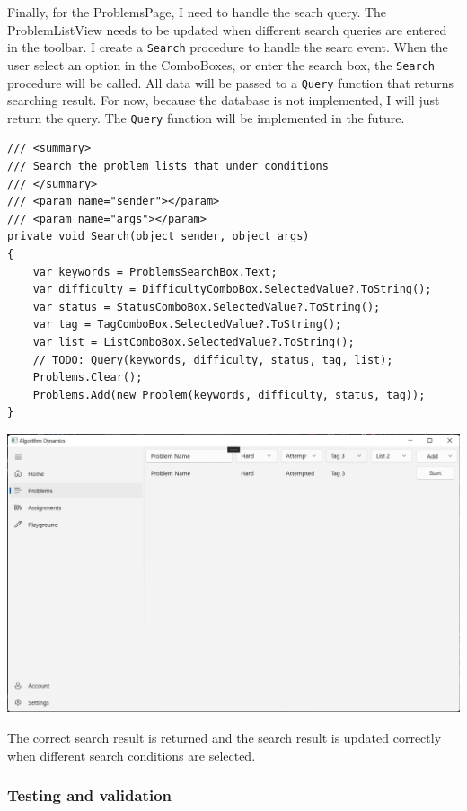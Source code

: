 \documentclass[a4paper]{report}
\begin{document}
Finally, for the ProblemsPage, I need to handle the searh query. The ProblemListView needs to be updated when different search queries are entered in the toolbar. I create a \verb|Search| procedure to handle the searc event. When the user select an option in the ComboBoxes, or enter the search box, the \verb|Search| procedure will be called. All data will be passed to a \verb|Query| function that returns searching result. For now, because the database is not implemented, I will just return the query. The \verb|Query| function will be implemented in the future.

\begin{verbatim}
/// <summary>
/// Search the problem lists that under conditions
/// </summary>
/// <param name="sender"></param>
/// <param name="args"></param>
private void Search(object sender, object args)
{
    var keywords = ProblemsSearchBox.Text;
    var difficulty = DifficultyComboBox.SelectedValue?.ToString();
    var status = StatusComboBox.SelectedValue?.ToString();
    var tag = TagComboBox.SelectedValue?.ToString();
    var list = ListComboBox.SelectedValue?.ToString();
    // TODO: Query(keywords, difficulty, status, tag, list);
    Problems.Clear();
    Problems.Add(new Problem(keywords, difficulty, status, tag));
}
\end{verbatim}

\includegraphics[width=\textwidth, height=\textheight, keepaspectratio]{ProblemsPage-Search}

The correct search result is returned and the search result is updated correctly when different search conditions are selected.

\subsubsection{Testing and validation}
\end{document}
